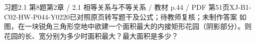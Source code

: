 \par\noindent\begin{minipage}{\linewidth}
\begin{bankitem}{习题2.1 第8题}{第2章 / 2.1 相等关系与不等关系 / 教材 p.44 / PDF 第51页}{XJ-B1-C02-HW-P044-Y0220}{已对照原页转写题干及公式；待教师复核；未制作答案}
如图，在一块锐角三角形空地中欲建一个面积最大的内接矩形花园（阴影部分）。则花园的长、宽分别为多少时面积最大？最大面积是多少？
\end{bankitem}
\end{minipage}\par\medskip
